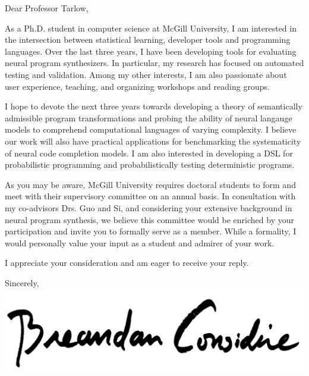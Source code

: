 \documentclass{letter}
\begin{document}
    \begin{letter}{}
        \opening{Dear Professor Tarlow,\\}
        As a Ph.D. student in computer science at McGill University, I am interested in the intersection between statistical learning, developer tools and programming languages. Over the last three years, I have been developing tools for evaluating neural program synthesizers. In particular, my research has focused on automated testing and validation. Among my other interests, I am also passionate about user experience, teaching, and organizing workshops and reading groups.

        I hope to devote the next three years towards developing a theory of semantically admissible program transformations and probing the ability of neural langauge models to comprehend computational languages of varying complexity. I believe our work will also have practical applications for benchmarking the systematicity of neural code completion models. I am also interested in developing a DSL for probabilistic programming and probabilistically testing deterministic programs.

        As you may be aware, McGill University requires doctoral students to form and meet with their supervisory committee on an annual basis. In consultation with my co-advisors Drs. Guo and Si, and considering your extensive background in neural program synthesis, we believe this committee would be enriched by your participation and invite you to formally serve as a member. While a formality, I would personally value your input as a student and admirer of your work.

        I appreciate your consideration and am eager to receive your reply.\\

        \closing{Sincerely,\\
        \includegraphics[scale=0.06]{signature.png}\\
        }
    \end{letter}
\end{document}
